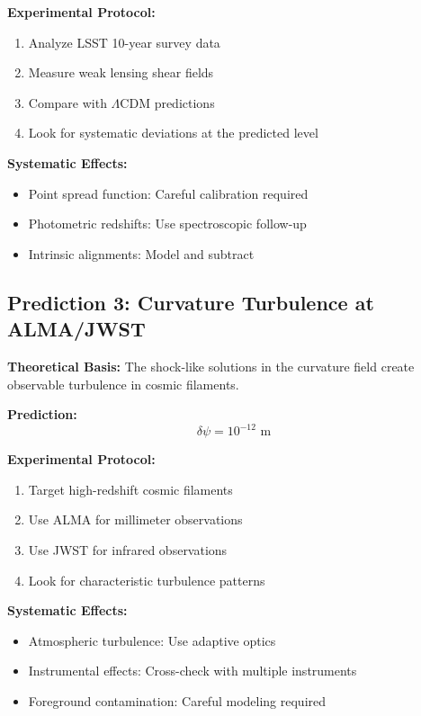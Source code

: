 \documentclass[11pt]{article}
\newcommand{\lamcdm}{$\Lambda$CDM}
\begin{document}
\textbf{Experimental Protocol:}
\begin{enumerate}
\item Analyze LSST 10-year survey data
\item Measure weak lensing shear fields
\item Compare with \lamcdm{} predictions
\item Look for systematic deviations at the predicted level
\end{enumerate}

\textbf{Systematic Effects:}
\begin{itemize}
\item Point spread function: Careful calibration required
\item Photometric redshifts: Use spectroscopic follow-up
\item Intrinsic alignments: Model and subtract
\end{itemize}

\subsection{Prediction 3: Curvature Turbulence at ALMA/JWST}

\textbf{Theoretical Basis:}
The shock-like solutions in the curvature field create observable turbulence in cosmic filaments.

\textbf{Prediction:}
\begin{equation}
\delta\psi = 10^{-12} \text{ m}
\end{equation}

\textbf{Experimental Protocol:}
\begin{enumerate}
\item Target high-redshift cosmic filaments
\item Use ALMA for millimeter observations
\item Use JWST for infrared observations
\item Look for characteristic turbulence patterns
\end{enumerate}

\textbf{Systematic Effects:}
\begin{itemize}
\item Atmospheric turbulence: Use adaptive optics
\item Instrumental effects: Cross-check with multiple instruments
\item Foreground contamination: Careful modeling required
\end{itemize}
\end{document}
